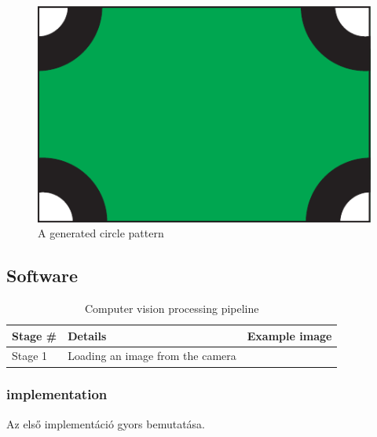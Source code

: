 \begin{figure}[h]
	\centering


	\includegraphics[valign=c,width=.65\linewidth]{include/figures/chapter_6/math_2}
	\caption{A generated circle pattern}
	\label{fig:case_study:convoluter_image}

\end{figure}

\subsection{Software}

\begin{table}[ht]
	\centering
	\begin{tabular}{@{}lll@{}}
	  \toprule
	  Stage \# & Details & Example image \\
	  \midrule
	  Stage 1 & Loading an image from the camera \\ 
	  \bottomrule
	\end{tabular}
	\caption{Computer vision processing pipeline}
	\label{table:case_study:pipeline}
\end{table}

\subsubsection{ implementation}
Az első implementáció gyors bemutatása.
